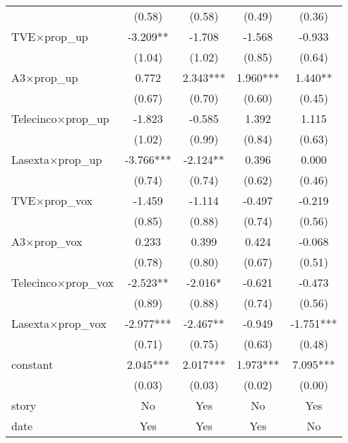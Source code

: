 \begin{tabular}{l*{4}{c}}
                    &      (0.58)   &      (0.58)   &      (0.49)   &      (0.36)   \\
TVE$\times$prop\_up  &      -3.209** &      -1.708   &      -1.568   &      -0.933   \\
                    &      (1.04)   &      (1.02)   &      (0.85)   &      (0.64)   \\
A3$\times$prop\_up   &       0.772   &       2.343***&       1.960***&       1.440** \\
                    &      (0.67)   &      (0.70)   &      (0.60)   &      (0.45)   \\
Telecinco$\times$prop\_up&      -1.823   &      -0.585   &       1.392   &       1.115   \\
                    &      (1.02)   &      (0.99)   &      (0.84)   &      (0.63)   \\
Lasexta$\times$prop\_up&      -3.766***&      -2.124** &       0.396   &       0.000   \\
                    &      (0.74)   &      (0.74)   &      (0.62)   &      (0.46)   \\
TVE$\times$prop\_vox &      -1.459   &      -1.114   &      -0.497   &      -0.219   \\
                    &      (0.85)   &      (0.88)   &      (0.74)   &      (0.56)   \\
A3$\times$prop\_vox  &       0.233   &       0.399   &       0.424   &      -0.068   \\
                    &      (0.78)   &      (0.80)   &      (0.67)   &      (0.51)   \\
Telecinco$\times$prop\_vox&      -2.523** &      -2.016*  &      -0.621   &      -0.473   \\
                    &      (0.89)   &      (0.88)   &      (0.74)   &      (0.56)   \\
Lasexta$\times$prop\_vox&      -2.977***&      -2.467** &      -0.949   &      -1.751***\\
                    &      (0.71)   &      (0.75)   &      (0.63)   &      (0.48)   \\
constant            &       2.045***&       2.017***&       1.973***&       7.095***\\
                    &      (0.03)   &      (0.03)   &      (0.02)   &      (0.00)   \\
\midrule
story               &          No   &         Yes   &          No   &         Yes   \\
date                &         Yes   &         Yes   &         Yes   &          No   \\

\end{tabular}
